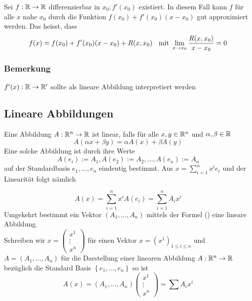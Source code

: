 Sei $f:\mathbb{R}\to\mathbb{R}$ differenzierbar in $x_0;f'(x_0)$ existiert. In diesem Fall kann $f$ für alle $x$ nahe $x_0$ durch die Funktion $f(x_0)+f'(x_0)(x-x_0)$ gut approximiert werden. Das heisst, dass \[f(x)=f(x_0)+f'(x_0)(x-x_0)+R(x,x_0)\text{ \hspace{2mm}mit  }\mathop {\lim }\limits_{x \to {x_0}} \frac{{R(x,{x_0})}}{{x - {x_0}}} = 0\]

\subsubsection*{Bemerkung}
$f'(x):\mathbb{R}\to\mathbb{R}'$ sollte als lineare Abbildung interpretiert werden
\subsection*{Lineare Abbildungen}
Eine Abbildung $A:\mathbb{R}^n\to\mathbb{R}$ ist linear, falls für alle $x,y\in\mathbb{R}^n$ und $\alpha,\beta\in\mathbb{R}$ \[A\left( \alpha x+\beta y\right) =\alpha A(x)+\beta A(y)\]
Eine solche Abbildung ist durch ihre Werte \[A(e_i):=A_1,A(e_2):=A_2,\dots,A(e_n):=A_n\] auf der Standardbasis $e_1,\dots,e_n$ eindeutig bestimmt. Aus $x = \sum\limits_{i = 1}^n {{x^i}{e_i}} $ und der Linearität folgt nämlich

\[
A(x) = \sum\limits_{i = 1}^n {{x^i}A({e_i}) = \sum\limits_{i = 1}^n {{A_i}{x^i}} } \tag{\textasteriskcentered}
\]
Umgekehrt bestimmt ein Vektor $\left( A_1,\dots,A_n\right)$ mittels der Formel (\textasteriskcentered) eine lineare Abbildung.\\

Schreiben wir $x = \left( {\begin{array}{*{20}{c}}
{{x^1}}\\
 \vdots \\
{{x^n}}
\end{array}} \right)$ für einen Vektor $x = {({x^1})_{1 \le i \le n}}$ und \\ %
$A=\left( A_1,\dots,A_n\right)$ für die Darstellung einer linearen Abbildung $A:\mathbb{R}^n\to\mathbb{R}$ bezüglich die Standard Basis $\left\{e_1,\dots,e_n\right\}$ so ist \[A(x) = \left( {{A_1}, \ldots ,{A_n}} \right)\left( {\begin{array}{*{20}{c}}
{{x^1}}\\
 \vdots \\
{{x^n}}
\end{array}} \right) = \sum {{A_i}{x^i}} \]

